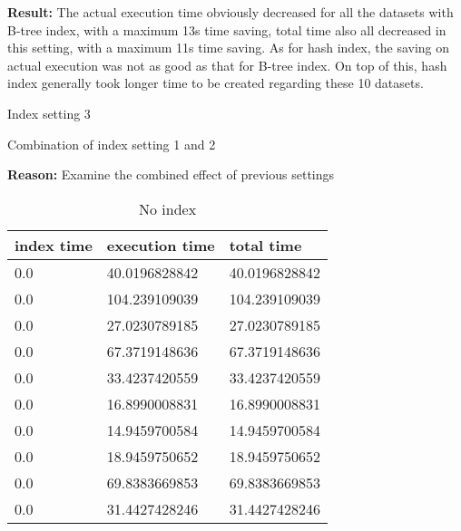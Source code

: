 \begin{itemize*}
\par \textbf{Result:} The actual execution time obviously decreased for all the datasets with B-tree index, with a maximum 13s time saving, total time also all decreased in this setting, with a maximum 11s time saving. As for hash index, the saving on actual execution was not as good as that for B-tree index. On top of this, hash index generally took longer time to be created regarding these 10 datasets.
\item{Index setting 3}
\par Combination of index setting 1 and 2
\par \textbf{Reason:} Examine the combined effect of previous settings

\begin{table}[H]
\begin{center}
\begin{tabular}{|l|l|l|}
\hline
index time & execution time & total time     \\ \hline
0.0 & 40.0196828842 & 40.0196828842 \\ \hline
0.0 & 104.239109039 & 104.239109039 \\ \hline
0.0 & 27.0230789185 & 27.0230789185 \\ \hline
0.0 & 67.3719148636 & 67.3719148636 \\ \hline
0.0 & 33.4237420559 & 33.4237420559 \\ \hline
0.0 & 16.8990008831 & 16.8990008831 \\ \hline
0.0 & 14.9459700584 & 14.9459700584 \\ \hline
0.0 & 18.9459750652 & 18.9459750652 \\ \hline
0.0 & 69.8383669853 & 69.8383669853 \\ \hline
0.0 & 31.4427428246 & 31.4427428246 \\ \hline
\end{tabular}
\end{center}
\caption{No index}
\end{table}


\end{itemize*}
